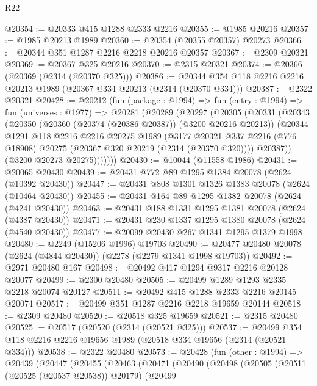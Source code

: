 \begin{lexlean}{R22}
\begin{coremodule}
@20354 := @20333 @415 @1288 @2333 @2216
@20355 := @1985 @20216
@20357 := @1985 @20213 @1989
@20360 := @20354 (@20355 @20357) @20273
@20366 := @20344 @351 @1287 @2216 @2218 @20216 @20357
@20367 := @2309 @20321
@20369 := @20367 @325 @20216
@20370 := @2315 @20321
@20374 := @20366 (@20369 (@2314 (@20370 @325)))
@20386 := @20344 @354 @118 @2216 @2216 @20213 @1989 (@20367 @334 @20213 (@2314 (@20370 @334)))
@20387 := @2322 @20321
@20428 := @20212
    (fun (package : @1994) =>
    fun (entry : @1994) =>
    fun (universes : @1977) =>
    @20281
      (@20289
        (@20297
          (@20305
            (@20331
              (@20343
                (@20350
                  (@20360 (@20374 (@20386 @20387)) (@3200 @20216 @20213))
                  (@20344
                    @1291
                    @118
                    @2216
                    @2216
                    @20275
                    @1989
                    (@3177
                      @20321
                      @337
                      @2216
                      (@776 @18908)
                      @20275
                      (@20367 @320 @20219 (@2314 (@20370 @320))))
                    @20387))
                (@3200 @20273 @20275)))))))
@20430 := @10044 (@11558 @1986)
@20431 := @20065 @20430
@20439 := @20431 @772 @89 @1295 @1384 @20078 (@2624 (@10392 @20430))
@20447 := @20431 @808 @1301 @1326 @1383 @20078 (@2624 (@10464 @20430))
@20455 := @20431 @164 @89 @1295 @1382 @20078 (@2624 (@4241 @20430))
@20463 := @20431 @188 @1331 @1295 @1381 @20078 (@2624 (@4387 @20430))
@20471 := @20431 @230 @1337 @1295 @1380 @20078 (@2624 (@4540 @20430))
@20477 := @20099 @20430 @267 @1341 @1295 @1379 @1998
@20480 := @2249 (@15206 @1996) @19703
@20490 := @20477 @20480 @20078 (@2624 (@4844 @20430)) (@2278 (@2279 @1341 @1998 @19703))
@20492 := @2971 @20480 @167
@20498 := @20492 @417 @1294 @9317 @2216 @20128 @20077
@20499 := @2300 @20480
@20505 := @20499 @1289 @1293 @2335 @2218 @20074 @20127
@20511 := @20492 @415 @1288 @2333 @2216 @20145 @20074
@20517 := @20499 @351 @1287 @2216 @2218 @19659 @20144
@20518 := @2309 @20480
@20520 := @20518 @325 @19659
@20521 := @2315 @20480
@20525 := @20517 (@20520 (@2314 (@20521 @325)))
@20537 := @20499 @354 @118 @2216 @2216 @19656 @1989 (@20518 @334 @19656 (@2314 (@20521 @334)))
@20538 := @2322 @20480
@20573 := @20428
    (fun (other : @1994) =>
    @20439
      (@20447
        (@20455
          (@20463
            (@20471
              (@20490
                (@20498
                  (@20505
                    (@20511 (@20525 (@20537 @20538)) @20179)
                    (@20499

\end{coremodule}
\end{lexlean}
